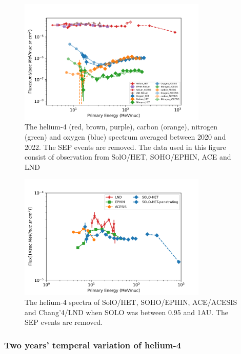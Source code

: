 \begin{figure}
    \centering
    \includegraphics[width = 0.8\textwidth]{images/ACR/ACE_SIS_CRIS_SOLO_all_3.png}
    \caption[The quite time spactra of helium, carbon, nitrogen and oxygen between 2020 and 2022]{The helium-4 (red, brown, purple), carbon (orange), nitrogen (green) and oxygen (blue) spectrum averaged between 2020 and 2022. The \ac{SEP} events are removed. The data used in this figure consist of observation from \ac{SolO}/\ac{HET}, \ac{SOHO}/\ac{EPHIN}, \ac{ACE} and \ac{LND}}
    \label{fig:overview}
\end{figure}
\begin{figure}
    \centering
    \includegraphics[width = 0.8\textwidth]{images/ACR/1AU_comparison_ACE_EPHIN_SOLO_SEP_version2.png}
    \caption[The helium spectra during the period \ac{SolO} between 0.95 and 1 au]{The helium-4 spectra of \ac{SolO}/\ac{HET}, \ac{SOHO}/\ac{EPHIN}, \ac{ACE}/\ac{ACESIS} and Chang'4/\ac{LND} when SOLO was between 0.95 and 1AU. The \ac{SEP} events are removed.}
    \label{fig:helium_spec_1au}
\end{figure}

\subsubsection{Two years' temperal variation of helium-4}

